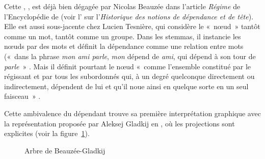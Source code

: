 Cette , , est déjà bien dégagée par Nicolas Beauzée dans l’article \textit{Régime} de l’Encyclopédie de \citeyear{Beauzée1765} (voir l’ sur l’\textit{Historique des notions de dépendance et de tête}). Elle est aussi sous-jacente chez Lucien Tesnière, qui considère le «~nœud~» tantôt comme un mot, tantôt comme un groupe. Dans les stemmas, il instancie les nœuds par des mots et définit la dépendance comme une relation entre mots («~dans la phrase \textit{mon ami parle}, \textit{mon} dépend de \textit{ami}, qui dépend à son tour de \textit{parle}~» \citep[chapitre 2]{tesniere1959elements}. Mais il définit pourtant le nœud «~comme l’ensemble constitué par le régissant et par tous les subordonnés qui, à un degré quelconque directement ou indirectement, dépendent de lui et qu’il noue ainsi en quelque sorte en un seul faisceau~» \citep[chapitre 3]{tesniere1959elements}.
 
Cette ambivalence du dépendant trouve sa première interprétation graphique avec la représentation proposée par Aleksej Gladkij en \citeyear{gladkij1968describing}, où les projections sont explicites (voir la figure~\ref{fig:laponie-gladkij}).

\begin{figure}
\caption{\label{fig:laponie-gladkij}Arbre de Beauzée-Gladkij}
\end{figure}

